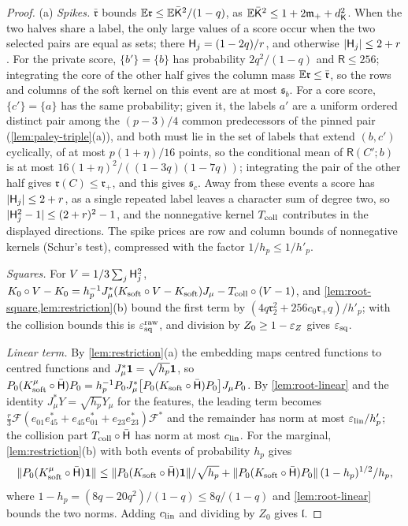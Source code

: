 \begin{proof}
(a) \emph{Spikes.} $\bar{\mathfrak r}$ bounds
$\mathbb E\mathfrak r\le\mathbb E\bar{\mathsf K}^2/(1-q)$, as $\mathbb E\bar{\mathsf K}^2\le1+2\mathfrak m_++d_{\mathsf K}^2$. When the two halves share a label, the only large values of a score
occur when the two selected pairs are equal as sets; there
$\mathsf H_{j}=(1-2q)/r$, and otherwise $|\mathsf H_{j}|\le2+r$. For the private score, $\{b'\}=\{b\}$ has
probability $2q^2/(1-q)$ and $\mathsf R\le256$; integrating the core of the other half gives
the column mass $\mathbb E\mathfrak r\le\bar{\mathfrak r}$, so the rows and columns of the soft kernel
on this event are at most $\mathfrak s_b$. For a core score, $\{c'\}=\{a\}$ has the same
probability; given it, the labels $a'$ are a uniform ordered distinct pair among the
$(p-3)/4$ common predecessors of the pinned pair (\cref{lem:paley-triple}(a)), and both must
lie in the set of labels that extend $(b,c')$ cyclically, of at most $p(1+\eta)/16$ points,
so the conditional mean of $\mathsf R(C';b)$ is at most $16(1+\eta)^2/((1-3q)(1-7q))$;
integrating the pair of the other half gives $\mathfrak r(C)\le\mathfrak r_+$, and this
gives $\mathfrak s_c$. Away from these events a score has
$|\mathsf H_{j}|\le2+r$, as a single repeated label leaves a character sum of degree two, so
$|\mathsf H_{j}^2-1|\le(2+r)^2-1$, and the nonnegative kernel $T_{\rm coll}$ contributes in the
displayed directions. The spike prices are row and column bounds of nonnegative kernels
(Schur's test), compressed with the factor $1/h_p\le1/h'_p$.

\emph{Squares.} For $V=1/3\sum_j\mathsf H_{j}^2$,
$K_0\circ V-K_0=h_p^{-1}J_\mu^*(K_{\rm soft}\circ V-K_{\rm soft})J_\mu
-T_{\rm coll}\circ(V-1)$, and \cref{lem:root-square,lem:restriction}(b) bound the first term
by $(4q\mathfrak r_2^2+256c_0\mathfrak r_+q)/h'_p$; with the collision bounds this is
$\varepsilon^{\rm raw}_{\rm sq}$, and division by $Z_0\ge1-\varepsilon_Z$ gives $\varepsilon_{\rm sq}$.

\emph{Linear term.} By \cref{lem:restriction}(a) the embedding maps centred functions to
centred functions and $J_\mu^*\mathbf 1=\sqrt{h_p}\mathbf 1$, so
$P_0(K^\mu_{\rm soft}\circ\bar{\mathsf H})P_0=h_p^{-1}P_0J_\mu^*\bigl[P_0(K_{\rm soft}\circ\bar{\mathsf H})P_0\bigr]
J_\mu P_0$. By \cref{lem:root-linear} and the identity $J_\mu^*Y=\sqrt{h_p}Y_\mu$ for
the features, the leading term becomes
$\frac r3\mathcal F(e_{01}e_{45}^*+e_{45}e_{01}^*+e_{23}e_{23}^*)\mathcal F^*$ and the remainder
has norm at most $\varepsilon_{\rm lin}/h'_p$; the collision part $T_{\rm coll}\circ\bar{\mathsf H}$ has norm at
most $c_{\rm lin}$. For the marginal, \cref{lem:restriction}(b) with both events of
probability $h_p$ gives
\[
 \|P_0(K^\mu_{\rm soft}\circ\bar{\mathsf H})\mathbf 1\|\le\|P_0(K_{\rm soft}\circ\bar{\mathsf H})\mathbf 1\|/\sqrt{h_p}
 +\|P_0(K_{\rm soft}\circ\bar{\mathsf H})P_0\|\,(1-h_p)^{1/2}/h_p,
\]
where $1-h_p=(8q-20q^2)/(1-q)\le8q/(1-q)$ and \cref{lem:root-linear} bounds the two norms.
Adding $c_{\rm lin}$ and dividing by $Z_0$ gives $\mathfrak l$.


\end{proof}
